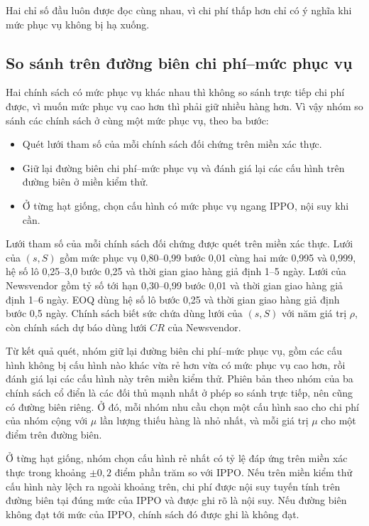 Hai chỉ số đầu luôn được đọc cùng nhau, vì chi phí thấp hơn chỉ có ý nghĩa khi mức phục vụ không bị hạ xuống.

\subsection{So sánh trên đường biên chi phí--mức phục vụ}
\label{subsec:giaoThucIso}

Hai chính sách có mức phục vụ khác nhau thì không so sánh trực tiếp chi phí được, vì muốn mức phục vụ cao hơn thì phải giữ nhiều hàng hơn. Vì vậy nhóm so sánh các chính sách ở cùng một mức phục vụ, theo ba bước:
\begin{itemize}
    \item Quét lưới tham số của mỗi chính sách đối chứng trên miền xác thực.
    \item Giữ lại đường biên chi phí--mức phục vụ và đánh giá lại các cấu hình trên đường biên ở miền kiểm thử.
    \item Ở từng hạt giống, chọn cấu hình có mức phục vụ ngang IPPO, nội suy khi cần.
\end{itemize}

Lưới tham số của mỗi chính sách đối chứng được quét trên miền xác thực. Lưới của $(s, S)$ gồm mức phục vụ 0,80--0,99 bước 0,01 cùng hai mức 0,995 và 0,999, hệ số lô 0,25--3,0 bước 0,25 và thời gian giao hàng giả định 1--5 ngày. Lưới của Newsvendor gồm tỷ số tới hạn 0,30--0,99 bước 0,01 và thời gian giao hàng giả định 1--6 ngày. EOQ dùng hệ số lô bước 0,25 và thời gian giao hàng giả định bước 0,5 ngày. Chính sách biết sức chứa dùng lưới của $(s, S)$ với năm giá trị $\rho$, còn chính sách dự báo dùng lưới $CR$ của Newsvendor.

Từ kết quả quét, nhóm giữ lại đường biên chi phí--mức phục vụ, gồm các cấu hình không bị cấu hình nào khác vừa rẻ hơn vừa có mức phục vụ cao hơn, rồi đánh giá lại các cấu hình này trên miền kiểm thử. Phiên bản theo nhóm của ba chính sách cổ điển là các đối thủ mạnh nhất ở phép so sánh trực tiếp, nên cũng có đường biên riêng. Ở đó, mỗi nhóm nhu cầu chọn một cấu hình sao cho chi phí của nhóm cộng với $\mu$ lần lượng thiếu hàng là nhỏ nhất, và mỗi giá trị $\mu$ cho một điểm trên đường biên.

Ở từng hạt giống, nhóm chọn cấu hình rẻ nhất có tỷ lệ đáp ứng trên miền xác thực trong khoảng $\pm 0{,}2$ điểm phần trăm so với IPPO. Nếu trên miền kiểm thử cấu hình này lệch ra ngoài khoảng trên, chi phí được nội suy tuyến tính trên đường biên tại đúng mức của IPPO và được ghi rõ là nội suy. Nếu đường biên không đạt tới mức của IPPO, chính sách đó được ghi là không đạt.

